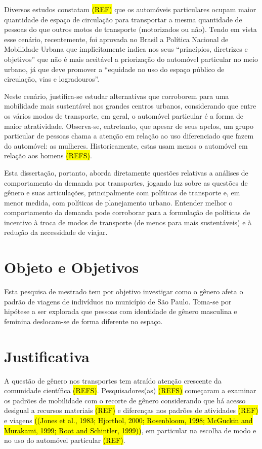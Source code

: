 Diversos estudos constatam \hl{(REF)} que os automóveis particulares ocupam maior quantidade de espaço de circulação para transportar a mesma quantidade de pessoas do que outros motos de transporte (motorizados ou não).  
Tendo em vista esse cenário, recentemente, foi aprovada no Brasil a Política Nacional de Mobilidade Urbana \cite{PNMU} que implicitamente indica nos seus ``princípios, diretrizes e objetivos'' que não é mais aceitável a priorização do automóvel particular no meio urbano, já que deve promover a ``equidade no uso do espaço público de circulação, vias e logradouros''.

Neste cenário, justifica-se estudar alternativas que corroborem para uma mobilidade mais sustentável nos grandes centros urbanos, considerando que entre os vários modos de transporte, em geral, o automóvel particular é a forma de maior atratividade. Observa-se, entretanto, que apesar de seus apelos, um grupo particular de pessoas chama a atenção em relação ao uso diferenciado que fazem do automóvel: as mulheres.
Historicamente, estas usam menos o automóvel em relação aos homens \hl{(REFS)}.

Esta dissertação, portanto, aborda diretamente questões relativas a análises de comportamento da demanda por transportes, jogando luz sobre as questões de  gênero e suas articulações, principalmente com políticas de transporte e, em menor medida, com políticas de planejamento urbano. Entender melhor o comportamento da demanda pode corroborar para a formulação de políticas de incentivo à troca de modos de transporte (de menos para mais sustentáveis) e à redução da necessidade de viajar.

\section{Objeto e Objetivos}

Esta pesquisa de mestrado tem por objetivo investigar como o gênero afeta o padrão de viagens de indivíduos no município de São Paulo. Toma-se por hipótese a ser explorada que pessoas com identidade de gênero masculina e feminina deslocam-se de forma diferente no espaço.

\section{Justificativa}

A questão de gênero nos transportes tem atraído atenção crescente da comunidade científica \hl{(REFS)}.
Pesquisadores(as) \hl{(REFS)} começaram a examinar os padrões de mobilidade com o recorte de gênero considerando que há acesso desigual a recursos materiais \hl{(REF)} e diferenças nos padrões de atividades \hl{(REF)} e viagens \hl{((Jones et al., 1983; Hjorthol, 2000; Rosenbloom, 1998; McGuckin and Murakami, 1999; Root and Schintler, 1999))}, em particular na escolha de modo e no uso do automóvel particular \hl{(REF)}.

